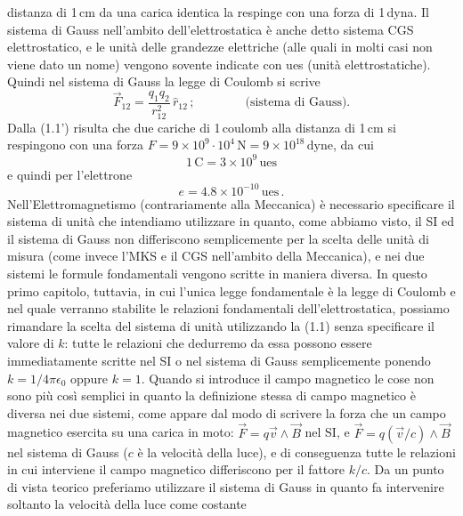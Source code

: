 distanza di 1\,cm da una carica identica la respinge con una forza di 1\,dyna.
Il sistema di Gauss nell'ambito dell'elettrostatica \`e anche detto sistema CGS
elettrostatico, e le unit\`a delle grandezze elettriche (alle quali in molti
casi non viene dato un nome) vengono sovente indicate con ues (unit\`a
elettrostatiche).\\
Quindi nel sistema di Gauss la legge di Coulomb si scrive
\begin{equation}
  \vec F_{12}=\frac{q_1q_2}{r_{12}^2}\,\hat r_{12}\,;\qquad\qquad
  \text{(sistema di Gauss).}
  \tag{1.1''}
\end{equation}
Dalla (1.1') risulta che due cariche di 1\,coulomb alla distanza di 1\,cm si
respingono con una forza
$F=9\times10^9\cdot10^4\,\mathrm{N}=9\times10^{18}\,\mathrm{dyne}$, da cui
\begin{equation}
  1\,\mathrm{C}=3\times10^9\,\mathrm{ues}
  \tag{1.3}
\end{equation}
e quindi per l'elettrone
\begin{equation}
  e=4.8\times10^{-10}\,\mathrm{ues}\,.
  \tag{1.2'}
\end{equation}
Nell'Elettromagnetismo (contrariamente alla Meccanica) \`e necessario
specificare il sistema di unit\`a che intendiamo utilizzare in quanto, come
abbiamo visto, il SI ed il sistema di Gauss non differiscono semplicemente per
la scelta delle unit\`a di misura (come invece l'MKS e il CGS nell'ambito della
Meccanica), e nei due sistemi le formule fondamentali vengono scritte in maniera
diversa. In questo primo capitolo, tuttavia, in cui l'unica legge fondamentale
\`e la legge di Coulomb e nel quale verranno stabilite le relazioni fondamentali
dell'elettrostatica, possiamo rimandare la scelta del sistema di unit\`a
utilizzando la (1.1) senza specificare il valore di $k$: tutte le relazioni che
dedurremo da essa possono essere immediatamente scritte nel SI o nel sistema di
Gauss semplicemente ponendo $k=1/4\pi\epsilon_0$ oppure $k=1$. Quando si
introduce il campo magnetico le cose non sono pi\`u cos\`i semplici in quanto la
definizione stessa di campo magnetico \`e diversa nei due sistemi, come appare
dal modo di scrivere la forza che un campo magnetico esercita su una carica in
moto: $\vec F=q\vec v\wedge\vec B$ nel SI, e $\vec F=q(\vec v/c)\wedge\vec B$
nel sistema di Gauss ($c$ \`e la velocit\`a della luce), e di conseguenza tutte
le relazioni in cui interviene il campo magnetico differiscono per il fattore
$k/c$. Da un punto di vista teorico preferiamo utilizzare il sistema di Gauss in
quanto fa intervenire soltanto la velocit\`a della luce come costante
